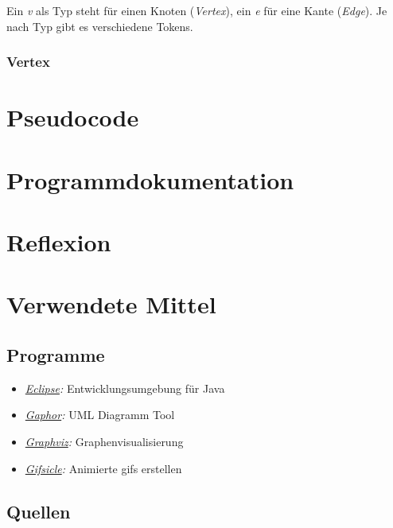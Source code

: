 \documentclass[a4paper,titlepage]{article}
\begin{document}
Ein \emph{v} als Typ steht für einen Knoten (\emph{Vertex}), ein \emph{e} für eine Kante (\emph{Edge}). Je nach Typ gibt es verschiedene Tokens.

\subsubsection{Vertex}


\newpage

\section{Pseudocode}

\newpage

\section{Programmdokumentation}

\newpage

\section{Reflexion}

\newpage

\section{Verwendete Mittel}

\subsection{Programme}

\begin{itemize}
\item \emph{\href{http://www.eclipse.org}{Eclipse}:} Entwicklungsumgebung für Java
\item \emph{\href{http://gaphor.sourceforge.net}{Gaphor}:} UML Diagramm Tool
\item \emph{\href{http://graphviz.org}{Graphviz}:} Graphenvisualisierung
\item \emph{\href{http://www.lcdf.org/gifsicle}{Gifsicle}:} Animierte gifs erstellen
\end{itemize}

\subsection{Quellen}
\end{document}
